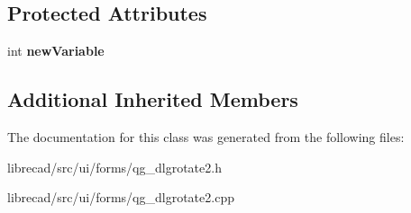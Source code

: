 \subsection*{Protected Attributes}
\begin{DoxyCompactItemize}
\item 
\hypertarget{classQG__DlgRotate2_a6b4c1f580191f81bedc60f0b5cba62b9}{int {\bfseries new\-Variable}}\label{classQG__DlgRotate2_a6b4c1f580191f81bedc60f0b5cba62b9}

\end{DoxyCompactItemize}
\subsection*{Additional Inherited Members}


The documentation for this class was generated from the following files\-:\begin{DoxyCompactItemize}
\item 
librecad/src/ui/forms/qg\-\_\-dlgrotate2.\-h\item 
librecad/src/ui/forms/qg\-\_\-dlgrotate2.\-cpp\end{DoxyCompactItemize}
